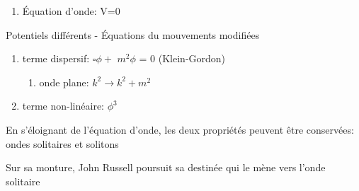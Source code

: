 \documentclass[handout]{beamer}
\begin{document}
\begin{frame}
\begin{enumerate}
\item Équation d'onde: V=0
\end{enumerate}

\begin{block}{Potentiels différents - Équations du mouvements modifiées}
\begin{enumerate}

\item terme dispersif: $\square\phi +$ \boldmath $m^2 \phi $ \unboldmath  = 0 (Klein-Gordon)\\
\begin{enumerate}
\item onde plane: $k^2 \rightarrow k^2+m^2$

\end{enumerate}
\item terme non-linéaire: $\phi^3$ \\
\end{enumerate}
\end{block}
En s'éloignant de l'équation d'onde, les deux propriétés peuvent être conservées: ondes solitaires et solitons 

\end{frame}

\begin{frame}
Sur sa monture, John Russell poursuit sa destinée qui le mène vers l'onde solitaire
\begin{columns}[T]
    \begin{column}[T]{.5\linewidth}
   \begin{figure}[0.3\textwidth]
    \end{figure}
    \end{column}
    \begin{column}[T]{.5\linewidth}
    \begin{figure}[0.3\textwidth]
    \end{figure}
    \end{column}
  \end{columns}
\end{frame}
\end{document}
